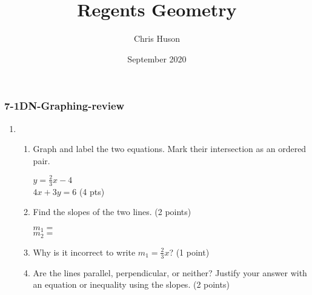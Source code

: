 \documentclass[12pt, twoside]{article}
\title{Regents Geometry}
\author{Chris Huson}
\date{September 2020}
\begin{document}
\subsubsection*{7-1DN-Graphing-review}
\begin{enumerate}
\item \begin{enumerate}
    \item Graph and label the two equations. Mark their intersection as an ordered pair.
      \begin{multicols}{2}
        $y =\frac{2}{3}x-4$ \\
        $4x+3y=6$ \hfill (4 pts)
      \end{multicols}     \vspace{1cm}
    \item Find the slopes of the two lines. \hfill (2 points)
      \begin{multicols}{2}
        $m_1=$ \\
        $m_2=$
      \end{multicols}
    \item Why is it incorrect to write $m_1=\frac{2}{3}x$? \hfill (1 point) \vspace{2cm}
    \item Are the lines parallel, perpendicular, or neither? Justify your answer with an equation or inequality using the slopes. \hfill (2 points)
    \vspace{2cm}
  \end{enumerate}
    \begin{center}
    \end{center}


\end{enumerate}
\end{document}
